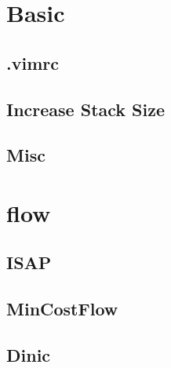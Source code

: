 \documentclass[a4paper,10pt,twocolumn,oneside]{article}
\begin{document}
\pagestyle{fancy}
\fancyfoot{}
\fancyhead[R]{\thepage}
\renewcommand{\headrulewidth}{0.4pt}
\renewcommand{\contentsname}{Contents} 

\scriptsize
\tableofcontents

\newpage

\section{Basic}
\subsection{.vimrc}


%

\subsection{Increase Stack Size}


\subsection{Misc}


\section{flow}

\subsection{ISAP}


\subsection{MinCostFlow}


\subsection{Dinic}

\end{document}
